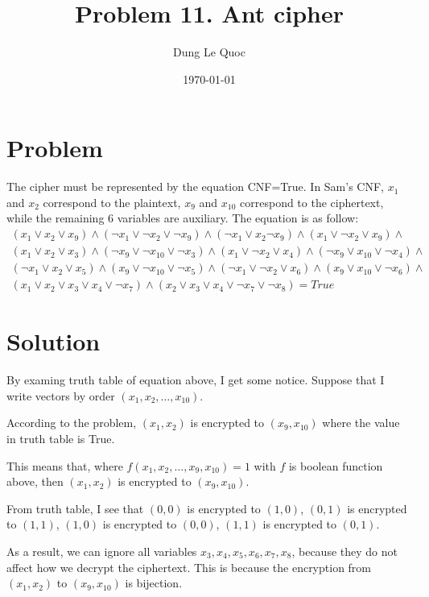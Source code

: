\documentclass{article}
\title{Problem 11. Ant cipher}
\author{Dung Le Quoc}
\date{\today}
\begin{document}
\maketitle

\section{Problem}

The cipher must be represented by the equation CNF=True. In Sam's CNF, $x_1$ and $x_2$ correspond to the plaintext, $x_9$ and $x_{10}$ correspond to the ciphertext, while the remaining 6 variables are auxiliary. The equation is as follow:
\begin{align*}
    (x_1 \lor x_2 \lor x_9) \land (\lnot x_1 \lor \lnot x_2 \lor \lnot x_9) \land (\lnot x_1 \lor x_2 \lnot x_9) \land (x_1 \lor \lnot x_2 \lor x_9) \land \\
    (x_1 \lor x_2 \lor x_3) \land (\lnot x_9 \lor \lnot x_{10} \lor \lnot x_3) \land (x_1 \lor \lnot x_2 \lor x_4) \land (\lnot x_9 \lor x_{10} \lor \lnot x_4) \land \\
    (\lnot x_1 \lor x_2 \lor x_5) \land (x_9 \lor \lnot x_{10} \lor \lnot x_5) \land (\lnot x_1 \lor \lnot x_2 \lor x_6) \land (x_9 \lor x_{10} \lor \lnot x_6) \land \\
    (x_1 \lor x_2 \lor x_3 \lor x_4 \lor \lnot x_7) \land (x_2 \lor x_3 \lor x_4 \lor \lnot x_7 \lor \lnot x_8) = True
\end{align*}

\section{Solution}

By examing truth table of equation above, I get some notice. Suppose that I write vectors by order $(x_1, x_2, \ldots, x_{10})$. 

According to the problem, $(x_1, x_2)$ is encrypted to $(x_9, x_{10})$ where the value in truth table is True.

This means that, where $f(x_1, x_2, \ldots, x_9, x_{10}) = 1$ with $f$ is boolean function above, then $(x_1, x_2)$ is encrypted to $(x_9, x_{10})$.

From truth table, I see that $(0, 0)$ is encrypted to $(1, 0)$, $(0, 1)$ is encrypted to $(1, 1)$, $(1, 0)$ is encrypted to $(0, 0)$, $(1, 1)$ is encrypted to $(0 ,1)$.

As a result, we can ignore all variables $x_3, x_4, x_5, x_6, x_7, x_8$, because they do not affect how we decrypt the ciphertext. This is because the encryption from $(x_1, x_2)$ to $(x_9, x_{10})$ is bijection.
\end{document}
